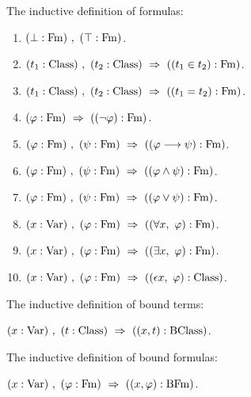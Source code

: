 \begin{metadefinition}%
The inductive definition of formulas:
\begin{enumerate}
\item $(\bot:\Fm)\ ,\ (\top:\Fm)$. %
\item $(t_1:{\text{Class}})\ ,\ (t_2:{\text{Class}}) \ \Rightarrow\  ((t_1 \in t_2):\mathrm{Fm})$.
\item $(t_1:{\text{Class}})\ ,\ (t_2:{\text{Class}}) \ \Rightarrow\  ((t_1=t_2):\mathrm{Fm})$.
\item $(\varphi:\mathrm{Fm}) \ \Rightarrow\  ((\neg \varphi):\mathrm{Fm})$.
\item $(\varphi:\mathrm{Fm})\ ,\ (\psi:\mathrm{Fm}) \ \Rightarrow\  ((\varphi \longrightarrow \psi):\mathrm{Fm})$.
\item $(\varphi:\mathrm{Fm})\ ,\ (\psi:\mathrm{Fm}) \ \Rightarrow\  ((\varphi \land \psi):\mathrm{Fm})$.
\item $(\varphi:\mathrm{Fm})\ ,\ (\psi:\mathrm{Fm}) \ \Rightarrow\  ((\varphi \lor \psi):\mathrm{Fm})$.
\item $(x:\mathrm{Var})\ ,\ (\varphi:\mathrm{Fm}) \ \Rightarrow\  ((\forall x,\ \varphi):\mathrm{Fm})$.
\item $(x:\mathrm{Var})\ ,\ (\varphi:\mathrm{Fm}) \ \Rightarrow\  ((\exists x,\ \varphi):\mathrm{Fm})$.

\item $(x:\mathrm{Var})\ ,\ (\varphi:\mathrm{Fm}) \ \Rightarrow\  ((\epsilon x,\ \varphi):{\text{Class}})$.%
\end{enumerate}
\end{metadefinition}
\begin{metadefinition}[$\BClass$]%
The inductive definition of bound terms:%
\item $(x:\mathrm{Var})\ ,\ (t:{\text{Class}}) \ \Rightarrow\  ((x , t):\mathrm{BClass})$.
\end{metadefinition}
\begin{metadefinition}[$\BFm$]%
The inductive definition of bound formulas:%
\item $(x:\mathrm{Var})\ ,\ (\varphi:\mathrm{Fm}) \ \Rightarrow\  ((x , \varphi):\mathrm{BFm})$.%
\end{metadefinition}


